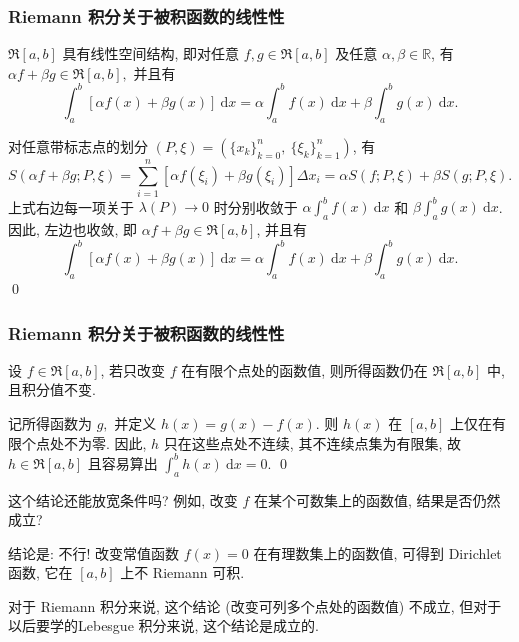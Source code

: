 \begin{frame}
\frametitle{Riemann 积分关于被积函数的线性性}

\begin{prop}[线性性]
$\mathfrak{R}[a, b]$ 具有线性空间结构, 即对任意 $f, g \in \mathfrak{R}[a, b]$ 及任意 $\alpha, \beta \in \mathbb{R}$, 有 $\alpha f + \beta g \in \mathfrak{R}[a, b],$ 并且有
\[
\int_a^b [\alpha f(x) + \beta g(x)] ~ \mathrm{d} x = \alpha \int_a^b f(x) ~ \mathrm{d} x + \beta \int_a^b g(x) ~ \mathrm{d} x.
\]
\end{prop}

\pause
\vspace{1em}

\startproof[bg=yellow, fg=red]
对任意带标志点的划分 $(P, \xi) = (\{x_k\}_{k=0}^n,\ \{\xi_k\}_{k=1}^n)$, 有
\[
S(\alpha f + \beta g; P, \xi) = \sum_{i=1}^n [\alpha f(\xi_i) + \beta g(\xi_i)] \Delta x_i = \alpha S(f; P, \xi) + \beta S(g; P, \xi).
\]
上式右边每一项关于 $\lambda(P) \to 0$ 时分别收敛于 $\alpha \int_a^b f(x) ~ \mathrm{d} x$ 和 $\beta \int_a^b g(x) ~ \mathrm{d} x$. 因此, 左边也收敛, 即 $\alpha f + \beta g \in \mathfrak{R}[a, b]$, 并且有
\[
\int_a^b [\alpha f(x) + \beta g(x)] ~ \mathrm{d} x = \alpha \int_a^b f(x) ~ \mathrm{d} x + \beta \int_a^b g(x) ~ \mathrm{d} x.
\]
\qed

\end{frame}


\begin{frame}
\frametitle{Riemann 积分关于被积函数的线性性}

\begin{cor}
设 $f \in \mathfrak{R}[a, b]$, 若只改变 $f$ 在有限个点处的函数值, 则所得函数仍在 $\mathfrak{R}[a, b]$ 中, 且积分值不变.
\end{cor}

\vspace{1em}

\startproof[bg=yellow, fg=red]
记所得函数为 $g,$ 并定义 $h(x) = g(x) - f(x).$ 则 $h(x)$ 在 $[a, b]$ 上仅在有限个点处不为零. 因此, $h$ 只在这些点处不连续, 其不连续点集为有限集, 故 $h \in \mathfrak{R}[a, b]$ 且容易算出 $\int_a^b h(x) ~ \mathrm{d} x = 0.$
\qed

\pause
\vspace{1em}

\begin{question}
这个结论还能放宽条件吗? 例如, 改变 $f$ 在某个可数集上的函数值, 结果是否仍然成立?
\end{question}

\pause

\alert{结论是: 不行!} 改变常值函数 $f(x) = 0$ 在有理数集上的函数值, 可得到 Dirichlet 函数, 它在 $[a, b]$ 上不 Riemann 可积.

对于 Riemann 积分来说, 这个结论 (改变可列多个点处的函数值) 不成立, 但对于以后要学的\alert{Lebesgue 积分}来说, 这个结论是成立的.

\end{frame}

